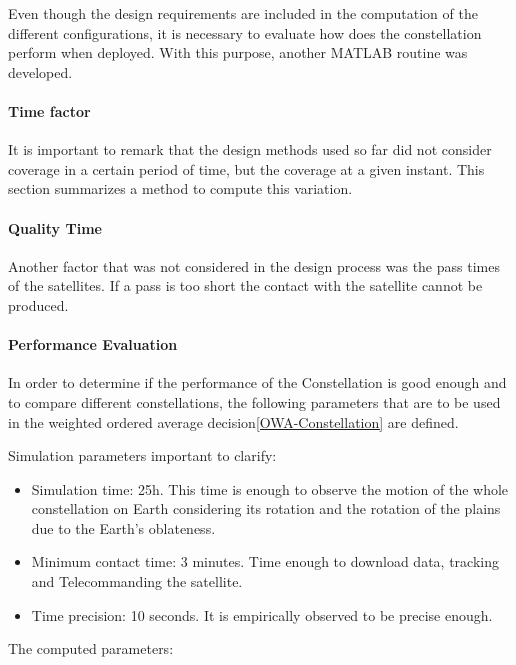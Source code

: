 Even though the design requirements are included in the computation of the different configurations, it is necessary to evaluate how does the constellation perform when deployed. With this purpose, another MATLAB routine was developed. 

\paragraph{Time factor}It is important to remark that the design methods used so far did not consider coverage in a certain period of time, but the coverage at a given instant. This section summarizes a method to compute this variation.

\paragraph{Quality Time}Another factor that was not considered in the design process was the pass times of the satellites. If a pass is too short the contact with the satellite cannot be produced. 

\paragraph{Performance Evaluation}In order to determine if the performance of the Constellation is good enough and to compare different constellations, the following parameters that are to be used in the weighted ordered average decision\ref{OWA-Constellation} are defined.

Simulation parameters important to clarify:

\begin{itemize}
\item Simulation time: 25h. This time is enough to observe the motion of the whole constellation on Earth considering its rotation and the rotation of the plains due to the Earth's oblateness.
\item Minimum contact time: 3 minutes. Time enough to download data, tracking and Telecommanding the satellite.
\item Time precision: 10 seconds. It is empirically observed to be precise enough.
\end{itemize}

The computed parameters:\label{PerfAnal}

